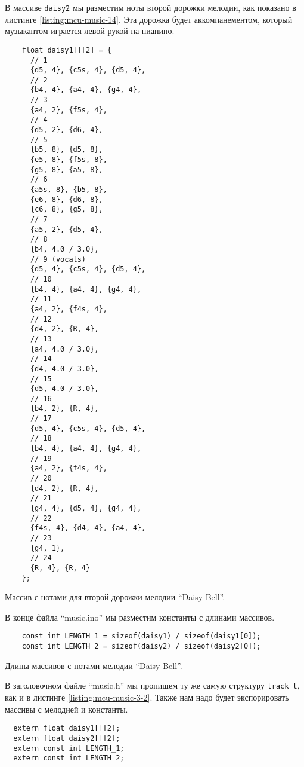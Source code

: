 \documentclass[../sparc.tex]{subfiles}
\begin{document}
В массиве \texttt{daisy2} мы разместим ноты второй дорожки мелодии, как
показано в листинге \ref{listing:mcu-music-14}.  Эта дорожка будет
аккомпанементом, который музыкантом играется левой рукой на пианино.

\begin{listing}[ht]
  \begin{verbatim}
    float daisy1[][2] = {
      // 1
      {d5, 4}, {c5s, 4}, {d5, 4},
      // 2
      {b4, 4}, {a4, 4}, {g4, 4},
      // 3
      {a4, 2}, {f5s, 4},
      // 4
      {d5, 2}, {d6, 4},
      // 5
      {b5, 8}, {d5, 8},
      {e5, 8}, {f5s, 8},
      {g5, 8}, {a5, 8},
      // 6
      {a5s, 8}, {b5, 8},
      {e6, 8}, {d6, 8},
      {c6, 8}, {g5, 8},
      // 7
      {a5, 2}, {d5, 4},
      // 8
      {b4, 4.0 / 3.0},
      // 9 (vocals)
      {d5, 4}, {c5s, 4}, {d5, 4},
      // 10
      {b4, 4}, {a4, 4}, {g4, 4},
      // 11
      {a4, 2}, {f4s, 4},
      // 12
      {d4, 2}, {R, 4},
      // 13
      {a4, 4.0 / 3.0},
      // 14
      {d4, 4.0 / 3.0},
      // 15
      {d5, 4.0 / 3.0},
      // 16
      {b4, 2}, {R, 4},
      // 17
      {d5, 4}, {c5s, 4}, {d5, 4},
      // 18
      {b4, 4}, {a4, 4}, {g4, 4},
      // 19
      {a4, 2}, {f4s, 4},
      // 20
      {d4, 2}, {R, 4},
      // 21
      {g4, 4}, {d5, 4}, {g4, 4},
      // 22
      {f4s, 4}, {d4, 4}, {a4, 4},
      // 23
      {g4, 1},
      // 24
      {R, 4}, {R, 4}
    };
  \end{verbatim}
  \caption{Массив с нотами для второй дорожки мелодии ``Daisy Bell''.}
  \label{listing:mcu-music-14}
\end{listing}

В конце файла ``music.ino'' мы разместим константы с длинами массивов.

\begin{listing}[H]
  \begin{verbatim}
    const int LENGTH_1 = sizeof(daisy1) / sizeof(daisy1[0]);
    const int LENGTH_2 = sizeof(daisy2) / sizeof(daisy2[0]);
  \end{verbatim}
  \caption{Длины массивов с нотами мелодии ``Daisy Bell''.}
  \label{listing:mcu-music-15}
\end{listing}

В заголовочном файле ``music.h'' мы пропишем ту же самую структуру
\texttt{track_t}, как и в листинге \ref{listing:mcu-music-3-2}.  Также
нам надо будет экспорировать массивы с мелодией и константы.

\begin{verbatim}
  extern float daisy1[][2];
  extern float daisy2[][2];
  extern const int LENGTH_1;
  extern const int LENGTH_2;
\end{verbatim}
\end{document}
